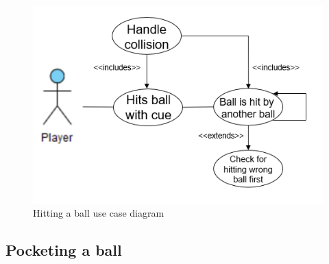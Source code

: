 \documentclass[10pt]{article}
\begin{document}
		\begin{figure}[H]
			\includegraphics[width=\linewidth]{latex_images/HittingBallUseCase.png}
			\caption{Hitting a ball use case diagram}
		\end{figure}
		
	\subsection{Pocketing a ball}
\end{document}
